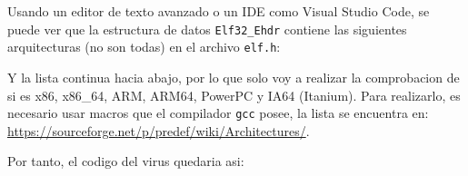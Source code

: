 \documentclass{article}
\begin{document}
Usando un editor de texto avanzado o un IDE como Visual Studio Code, se puede ver que la estructura de datos \verb|Elf32_Ehdr| contiene las siguientes arquitecturas (no son todas) en el archivo \verb|elf.h|:


Y la lista continua hacia abajo, por lo que solo voy a realizar la comprobacion de si es x86, x86\_64, ARM, ARM64, PowerPC y IA64 (Itanium). Para realizarlo, es necesario usar macros que el compilador \verb|gcc| posee, la lista se encuentra en: \url{https://sourceforge.net/p/predef/wiki/Architectures/}.

Por tanto, el codigo del virus quedaria asi:

\end{document}
